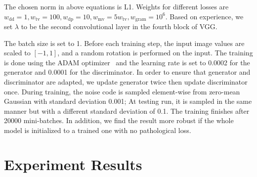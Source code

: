 \documentclass[letterpaper]{article} %
\begin{document}


	The chosen norm in above equations is L1.  Weights for different losses are $ w_\mathrm{dd} = 1, w_\mathrm{tv} = 100, w_\mathrm{dp} = 10, w_\mathrm{mv} = 5 w_\mathrm{tv}, w_\mathrm{gram} = 10^6 $. Based on experience, we set $ \lambda $ to be the second convolutional layer in the fourth block of VGG.

	The batch size is set to 1. Before each training step, the input image values are scaled to $[-1, 1]$, and a random rotation is performed on the input.
	The training is done using the ADAM optimizer~\cite{kingma2014adam} and the learning rate is set to 0.0002 for the generator and 0.0001 for the discriminator. In order to ensure that generator and discriminator are adapted, we update generator twice then update discriminator once. During training, the noise code is sampled element-wise from zero-mean Gaussian with standard deviation 0.001; At testing run, it is sampled in the same manner but with a different standard deviation of 0.1.
	The training finishes after 20000 mini-batches. In addition, we find the result more robust if the whole model is initialized to a trained one with no pathological loss.




	\section{Experiment Results}
\end{document}
